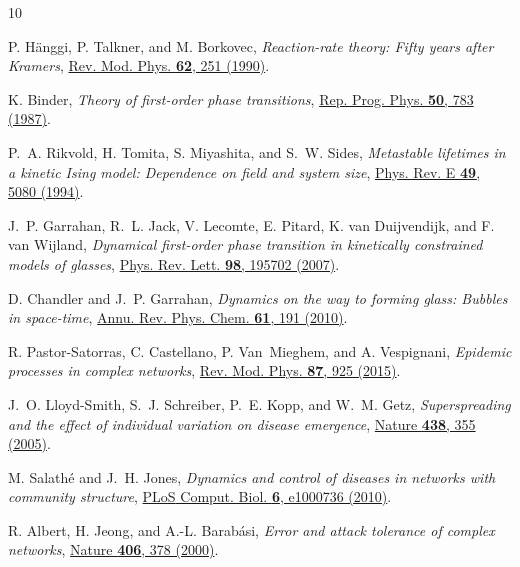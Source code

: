 \documentclass[english,10pt,aps,pra,twocolumn,superscriptaddress,floatfix,fleqn]{revtex4-2}
\begin{document}
\begin{thebibliography}{10}

P. H\"anggi, P. Talkner, and M. Borkovec, {\em Reaction-rate theory: Fifty
  years after Kramers}, \href{http://dx.doi.org/10.1103/RevModPhys.62.251}
  {Rev. Mod. Phys. {\bf 62},  251  (1990)}.

K. Binder, {\em Theory of first-order phase transitions},
  \href{http://dx.doi.org/10.1088/0034-4885/50/7/001} {Rep. Prog. Phys. {\bf
  50},  783  (1987)}.

P.~A. Rikvold, H. Tomita, S. Miyashita, and S.~W. Sides, {\em Metastable
  lifetimes in a kinetic Ising model: Dependence on field and system size},
  \href{http://dx.doi.org/10.1103/PhysRevE.49.5080} {Phys. Rev. E {\bf 49},
  5080  (1994)}.

J.~P. Garrahan, R.~L. Jack, V. Lecomte, E. Pitard, K. van Duijvendijk, and F.
  van Wijland, {\em Dynamical first-order phase transition in kinetically
  constrained models of glasses},
  \href{http://dx.doi.org/10.1103/PhysRevLett.98.195702} {Phys. Rev. Lett. {\bf
  98},  195702  (2007)}.

D. Chandler and J.~P. Garrahan, {\em Dynamics on the way to forming glass:
  Bubbles in space-time},
  \href{http://dx.doi.org/10.1146/annurev.physchem.040808.090405} {Annu. Rev.
  Phys. Chem. {\bf 61},  191  (2010)}.

R. Pastor-Satorras, C. Castellano, P. Van~Mieghem, and A. Vespignani, {\em
  Epidemic processes in complex networks},
  \href{http://dx.doi.org/10.1103/RevModPhys.87.925} {Rev. Mod. Phys. {\bf 87},
   925  (2015)}.

J.~O. Lloyd-Smith, S.~J. Schreiber, P.~E. Kopp, and W.~M. Getz, {\em
  Superspreading and the effect of individual variation on disease emergence},
  \href{http://dx.doi.org/10.1038/nature04153} {Nature {\bf 438},  355
  (2005)}.

M. Salath{\'{e}} and J.~H. Jones, {\em Dynamics and control of diseases in
  networks with community structure},
  \href{http://dx.doi.org/10.1371/journal.pcbi.1000736} {{PLoS} Comput. Biol.
  {\bf 6},  e1000736  (2010)}.

R. Albert, H. Jeong, and A.-L. Barab\'{a}si, {\em Error and attack tolerance of
  complex networks}, \href{http://dx.doi.org/10.1038/35019019} {Nature {\bf
  406},  378  (2000)}.


\end{thebibliography}
\end{document}
